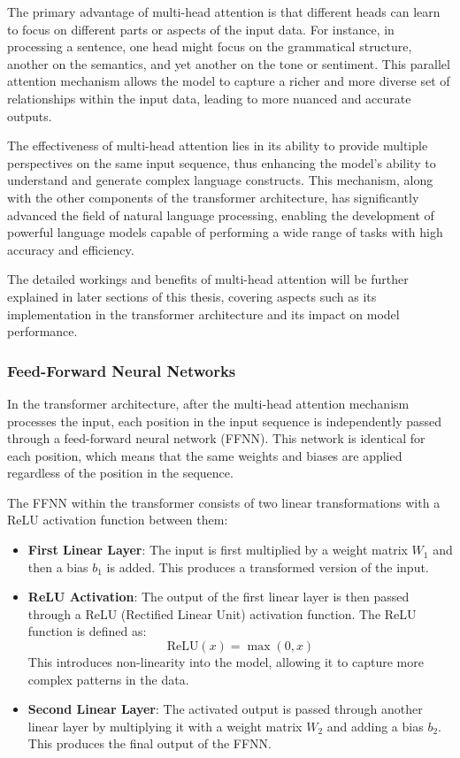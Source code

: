The primary advantage of multi-head attention is that different heads can learn to focus on different parts or aspects of the input data. For instance, in processing a sentence, one head might focus on the grammatical structure, another on the semantics, and yet another on the tone or sentiment. This parallel attention mechanism allows the model to capture a richer and more diverse set of relationships within the input data, leading to more nuanced and accurate outputs.

The effectiveness of multi-head attention lies in its ability to provide multiple perspectives on the same input sequence, thus enhancing the model's ability to understand and generate complex language constructs. This mechanism, along with the other components of the transformer architecture, has significantly advanced the field of natural language processing, enabling the development of powerful language models capable of performing a wide range of tasks with high accuracy and efficiency. 

The detailed workings and benefits of multi-head attention will be further explained in later sections of this thesis, covering aspects such as its implementation in the transformer architecture and its impact on model performance.

\subsubsection{Feed-Forward Neural Networks}

In the transformer architecture, after the multi-head attention mechanism processes the input, each position in the input sequence is independently passed through a feed-forward neural network (FFNN). This network is identical for each position, which means that the same weights and biases are applied regardless of the position in the sequence.

The FFNN within the transformer consists of two linear transformations with a ReLU activation function between them:

\begin{itemize}
    \item \textbf{First Linear Layer}: The input is first multiplied by a weight matrix \( W_1 \) and then a bias \( b_1 \) is added. This produces a transformed version of the input.
    \item \textbf{ReLU Activation}: The output of the first linear layer is then passed through a ReLU (Rectified Linear Unit) activation function. The ReLU function is defined as:
    \begin{equation}
        \text{ReLU}(x) = \max(0, x)
    \end{equation}
    This introduces non-linearity into the model, allowing it to capture more complex patterns in the data.
    \item \textbf{Second Linear Layer}: The activated output is passed through another linear layer by multiplying it with a weight matrix \( W_2 \) and adding a bias \( b_2 \). This produces the final output of the FFNN.
\end{itemize}


